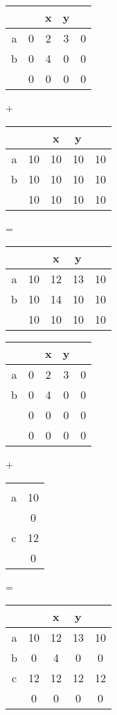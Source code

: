 \documentclass{sig-alternate} %
\begin{document}
\begin{figure*}[t]
\begin{tabular}{c|cccc}
  &   & x & y &   \\
\hline
a & 0 & 2 & 3 & 0 \\
b & 0 & 4 & 0 & 0 \\
  & 0 & 0 & 0 & 0
\end{tabular}
+
\begin{tabular}{c|cccc}
  &   & x & y &   \\
\hline
a & 10 & 10 & 10 & 10 \\
b & 10 & 10 & 10 & 10 \\
  & 10 & 10 & 10 & 10
\end{tabular}
=
\begin{tabular}{c|cccc}
  &   & x & y &   \\
\hline
a & 10 & 12 & 13 & 10 \\
b & 10 & 14 & 10 & 10 \\
  & 10 & 10 & 10 & 10
\end{tabular}

\begin{tabular}{c|cccc}
  &   & x & y &   \\
\hline
a & 0 & 2 & 3 & 0 \\
b & 0 & 4 & 0 & 0 \\
  & 0 & 0 & 0 & 0 \\
  & 0 & 0 & 0 & 0 \\
\end{tabular}
+
\begin{tabular}{c|c}
  &   \\
a & 10 \\
  & 0  \\
c & 12 \\
  & 0  \\
\end{tabular}
=
\begin{tabular}{c|cccc}
  &   & x & y &   \\
\hline
a & 10 & 12 & 13 & 10 \\
b & 0 & 4 & 0 & 0 \\
c & 12 & 12 & 12 & 12 \\
 & 0 & 0 & 0 & 0 \\
\end{tabular}


\end{figure*}
\end{document}
